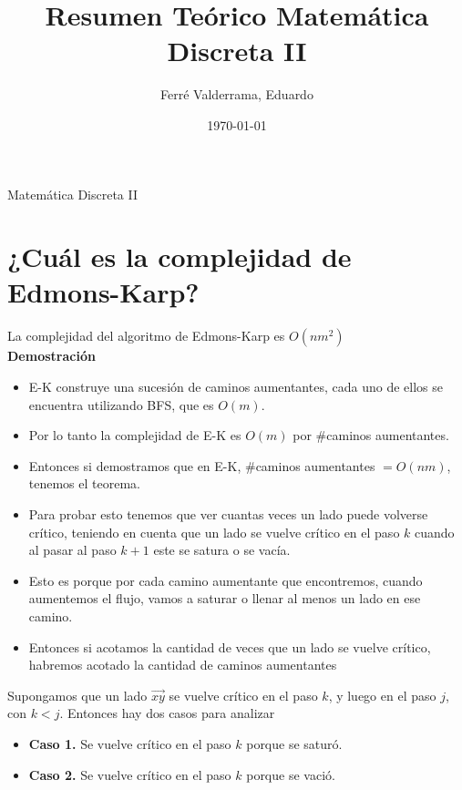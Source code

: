 \documentclass[11pt, a4paper]{article}
\title{Resumen Teórico Matemática Discreta II}
\author{Ferré Valderrama, Eduardo}
\date{\today}
\theoremstyle{definition}
\begin{document}
\maketitle
Matemática Discreta II
\tableofcontents

\section{¿Cuál es la complejidad de Edmons-Karp?}

La complejidad del algoritmo de Edmons-Karp es $O(nm^2)$\\
\textbf{Demostración}
    \begin{itemize}
        \item E-K construye una sucesión de caminos aumentantes, cada uno de ellos se encuentra utilizando BFS, que es $O(m)$.
        \item Por lo tanto la complejidad de E-K es $O(m)$ por $\#$caminos aumentantes.
        \item Entonces si demostramos que en E-K, $\#$caminos aumentantes  $= O(nm)$, tenemos el teorema.
        \item Para probar esto tenemos que ver cuantas veces un lado puede volverse crítico, teniendo en cuenta que un lado se vuelve crítico en el paso $k$ cuando al pasar al paso $k+1$ este se satura o se vacía.
        \item Esto es porque por cada camino aumentante que encontremos, cuando aumentemos el flujo, vamos a saturar o llenar al menos un lado en ese camino.
        \item Entonces si acotamos la cantidad de veces que un lado se vuelve crítico, habremos acotado la cantidad de caminos aumentantes
    \end{itemize}
    Supongamos que un lado $\overrightarrow{xy}$ se vuelve crítico en el paso $k$, y luego en el paso $j$, con $k<j$. Entonces hay dos casos para analizar
    \begin{itemize}
        \item \textbf{Caso 1.} Se vuelve crítico en el paso $k$ porque se saturó.
        \item \textbf{Caso 2.} Se vuelve crítico en el paso $k$ porque se vació.
    \end{itemize}
    
\end{document}
